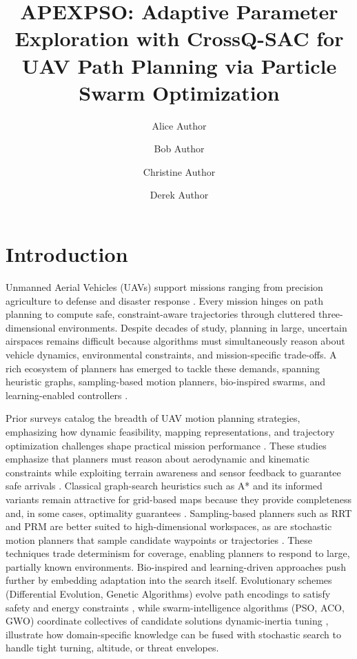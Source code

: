 \documentclass[fleqn,10pt]{wlscirep}
\title{APEXPSO: Adaptive Parameter Exploration with CrossQ-SAC for UAV Path Planning via Particle Swarm Optimization}
\author[1,*]{Alice Author}
\author[2]{Bob Author}
\author[1,2,+]{Christine Author}
\author[2,+]{Derek Author}
\affil[1]{Affiliation, department, city, postcode, country}
\affil[2]{Affiliation, department, city, postcode, country}
\affil[*]{corresponding.author@email.example}
\affil[+]{these authors contributed equally to this work}
\begin{document}
\raggedbottom

\flushbottom
\maketitle
%
%
\thispagestyle{empty}

\section*{Introduction}
\label{sec:intro}
  
Unmanned Aerial Vehicles (UAVs) support missions ranging from precision agriculture to defense and disaster response \cite{Delavarpour2021, Fascista2022, Alotaibi2019}.
Every mission hinges on path planning to compute safe, constraint-aware trajectories through cluttered three-dimensional environments.
Despite decades of study, planning in large, uncertain airspaces remains difficult because algorithms must simultaneously reason about vehicle dynamics, environmental constraints, and mission-specific trade-offs. 
A rich ecosystem of planners has emerged to tackle these demands, spanning heuristic graphs, sampling-based motion planners, bio-inspired swarms, and learning-enabled controllers \cite{AitSaadi2022}.

Prior surveys catalog the breadth of UAV motion planning strategies, emphasizing how dynamic feasibility, mapping representations, and trajectory optimization challenges shape practical mission performance \cite{Zhou2025UAVMotionPlanning}.
These studies emphasize that planners must reason about aerodynamic and kinematic constraints \cite{Zhou2025UAVMotionPlanning} while exploiting terrain awareness and sensor feedback to guarantee safe arrivals \cite{pathplanning_review2}.
Classical graph-search heuristics such as A* and its informed variants remain attractive for grid-based maps because they provide completeness and, in some cases, optimality guarantees \cite{pathplanning_review1,pathplanning_review2,Hart1968}.
Sampling-based planners such as RRT and PRM are better suited to high-dimensional workspaces, as are stochastic motion planners that sample candidate waypoints or trajectories \cite{Faust2017}.
These techniques trade determinism for coverage, enabling planners to respond to large, partially known environments.
Bio-inspired and learning-driven approaches push further by embedding adaptation into the search itself.
Evolutionary schemes (Differential Evolution, Genetic Algorithms) evolve path encodings to satisfy safety and energy constraints \cite{Debnath2024GAUAV}, while swarm-intelligence algorithms (PSO, ACO, GWO) coordinate collectives of candidate solutions dynamic-inertia tuning \cite{Bansal2011}, illustrate how domain-specific knowledge can be fused with stochastic search to handle tight turning, altitude, or threat envelopes.
\end{document}
